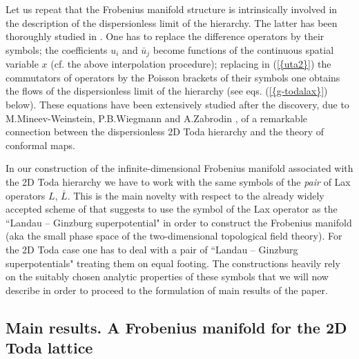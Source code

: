 \documentclass[numbook, envcountsame, envcountreset]{svjour3}
\begin{document}
Let us repeat that the Frobenius manifold structure is intrinsically involved in the description of the dispersionless limit of the hierarchy. The latter has been thoroughly studied in \cite{tt}. One has to replace the difference operators by their symbols; the coefficients $u_i$ and $\bar u_j$ become functions of the continuous spatial variable $x$ (cf. the above interpolation procedure); replacing in {(\ref{{uta2}})} the commutators of operators by the Poisson brackets of their symbols one obtains the flows of the dispersionless limit of the hierarchy (see eqs. {(\ref{{g-todalax}})} below). These equations have been extensively studied \cite{ber,its,kodama,mm,taka,teo,zabro} after the discovery, due to M.Mineev-Weinstein, P.B.Wiegmann and A.Zabrodin \cite{mwz,wz}, of a remarkable connection between the dispersionless 2D Toda hierarchy and the theory of conformal maps.

In our construction of the infinite-dimensional Frobenius manifold associated with the 2D Toda hierarchy we have to work with the same symbols of the {\it pair} of Lax operators $L$, $\bar L$. This is the main novelty with respect to the already widely accepted scheme of \cite{dvv} that suggests to use the symbol of the Lax operator as the ``Landau -- Ginzburg superpotential" in order to construct the Frobenius manifold (aka the small phase space of the two-dimensional topological field theory). For the 2D Toda case one has to deal with a pair of ``Landau -- Ginzburg superpotentials" treating them on equal footing.
The constructions heavily rely on the suitably chosen analytic properties of these symbols that we will now describe in order to proceed to the formulation of main results of the paper.

\medskip

\subsection{\bf Main results. A Frobenius manifold for the 2D Toda lattice}\par 
\end{document}
